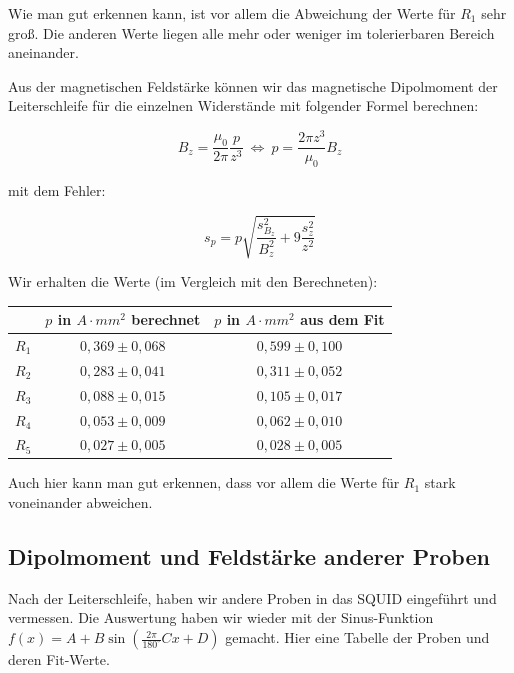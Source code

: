  Wie man gut erkennen kann, ist vor allem die Abweichung der Werte für $R_1$ sehr groß. Die anderen Werte liegen alle mehr oder weniger im tolerierbaren Bereich aneinander.
 
 Aus der magnetischen Feldstärke können wir das magnetische Dipolmoment der Leiterschleife für die einzelnen Widerstände mit folgender Formel berechnen:
 
$$ B_z = \frac{\mu_0}{2\pi}\frac{p}{z^3} \ \Leftrightarrow \  p = \frac{2\pi z^3}{\mu_0}B_z $$

mit dem Fehler:

$$s_p = p\sqrt{\frac{s_{B_z}^2}{B_z^2} + 9\frac{s_z^2}{z^2}}$$

Wir erhalten die Werte (im Vergleich mit den Berechneten):

\begin{center}
\begin{tabular}[H]{| c | c | c |} \hline
 & $p$ in $A\cdot mm^2$ berechnet & $p$ in $A\cdot mm^2$ aus dem Fit\\ \hline \hline
 $R_1$ & $0,369 \pm 0,068$ & $0,599\pm 0,100$\\
 $R_2$ & $0,283 \pm 0,041$ & $0,311\pm 0,052$\\
 $R_3$ & $0,088 \pm 0,015$ & $0,105\pm 0,017$\\
 $R_4$ & $0,053 \pm 0,009$ & $0,062\pm 0,010$\\
 $R_5$ & $0,027 \pm 0,005$ & $0,028\pm 0,005$\\ \hline
 \end{tabular}
 \end{center}
 
 Auch hier kann man gut erkennen, dass vor allem die Werte für $R_1$ stark voneinander abweichen.

\subsection{Dipolmoment und Feldstärke anderer Proben}

Nach der Leiterschleife, haben wir andere Proben in das SQUID eingeführt und vermessen. Die Auswertung haben wir wieder mit der Sinus-Funktion $f(x) = A + B\sin\left(\frac{2 \pi}{180^\circ}Cx+D\right)$ gemacht. Hier eine Tabelle der Proben und deren Fit-Werte.

